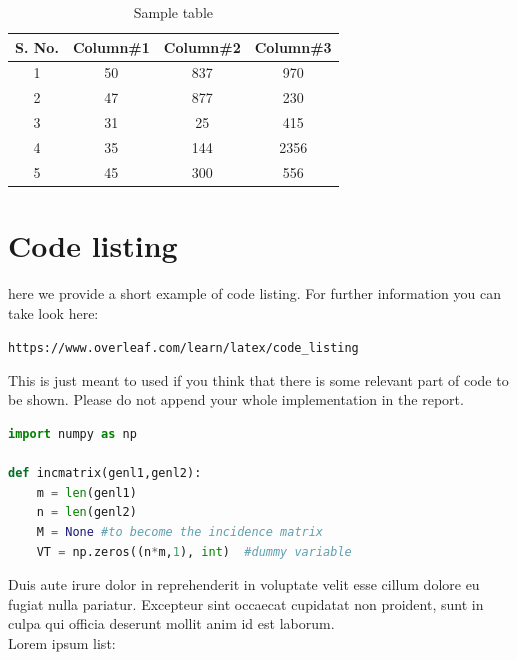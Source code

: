 \documentclass[a4paper,11pt]{report}
\begin{document}
\begin{table}[ht]
\caption{Sample table} %
\centering %
\begin{tabular}{c c c c}
\hline\hline %
S. No. & Column\#1 & Column\#2 & Column\#3 \\ [0.5ex]
\hline %
1 & 50 & 837 & 970 \\
2 & 47 & 877 & 230 \\
3 & 31 & 25 & 415 \\
4 & 35 & 144 & 2356 \\
5 & 45 & 300 & 556 \\ [1ex] %
\hline %
\end{tabular}
\label{table:nonlin} %
\end{table}

\section{Code listing}

here we provide a short example of code listing. For further information you can take look here:

\texttt{https://www.overleaf.com/learn/latex/code\_listing}

This is just meant to used if you think that there is some relevant part of code to be shown. Please do not append your whole implementation in the report.
\begin{lstlisting}[language=Python]
import numpy as np
    
def incmatrix(genl1,genl2):
    m = len(genl1)
    n = len(genl2)
    M = None #to become the incidence matrix
    VT = np.zeros((n*m,1), int)  #dummy variable

\end{lstlisting}

\newpage

Duis aute irure dolor in reprehenderit in voluptate velit esse cillum dolore eu fugiat nulla pariatur. Excepteur sint occaecat cupidatat non proident, sunt in culpa qui officia deserunt mollit anim id est laborum. \\ Lorem ipsum list:






\end{document}
